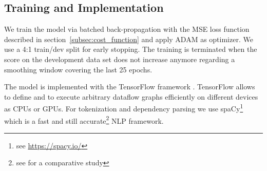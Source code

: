 \subsection{Training and Implementation}
We train the model via batched back-propagation with the \ac{MSE} loss function described in section~\ref{subsec:cost_function} and apply ADAM \autocite{kingma_adam_2014} %
as optimizer. We use a 4:1 train/dev split for early stopping. The training is terminated when the score on the development data set does not increase anymore regarding a smoothing window covering the last 25 epochs. 

The model is implemented with the TensorFlow framework  \autocite{abadi_tensorflow_2016}. TensorFlow allows to define and to execute arbitrary dataflow graphs efficiently on different devices as CPUs or GPUs. For tokenization and dependency parsing we use spaCy\footnote{see \url{https://spacy.io/}} which is a fast and still accurate\footnote{see \textcite{choi_it_2015} for a comparative study} \ac{NLP} framework. 






